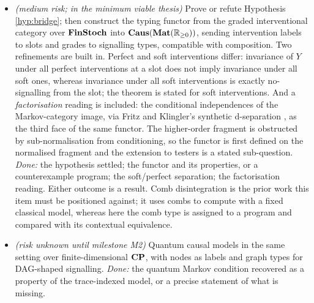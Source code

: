 \begin{itemize}[nosep]
\item[3a] \textit{(medium risk; in the minimum viable thesis)} Prove or refute Hypothesis \ref{hyp:bridge}; then construct the typing functor from the graded interventional category over $\mathbf{FinStoch}$ into $\mathbf{Caus}(\mathbf{Mat}(\mathbb{R}_{\geq 0}))$, sending intervention labels to slots and grades to signalling types, compatible with composition. Two refinements are built in. Perfect and soft interventions differ: invariance of $Y$ under all perfect interventions at a slot does not imply invariance under all soft ones, whereas invariance under all soft interventions is exactly no-signalling from the slot; the theorem is stated for soft interventions. And a \emph{factorisation} reading is included: the conditional independences of the Markov-category image, via Fritz and Klingler's synthetic d-separation \cite{fritz2023dseparation}, as the third face of the same functor. The higher-order fragment is obstructed by sub-normalisation from conditioning, so the functor is first defined on the normalised fragment and the extension to testers is a stated sub-question. \emph{Done:} the hypothesis settled; the functor and its properties, or a counterexample program; the soft/perfect separation; the factorisation reading. Either outcome is a result. Comb disintegration \cite{jacobs2019causal} is the prior work this item must be positioned against; it uses combs to compute with a fixed classical model, whereas here the comb type is assigned to a program and compared with its contextual equivalence.
\item[3b] \textit{(risk unknown until milestone M2)} Quantum causal models \cite{barrett2019quantumcausalmodels} in the same setting over finite-dimensional $\mathbf{CP}$, with nodes as labels and graph types \cite{simmons2024thesis} for DAG-shaped signalling. \emph{Done:} the quantum Markov condition recovered as a property of the trace-indexed model, or a precise statement of what is missing.
\end{itemize}

